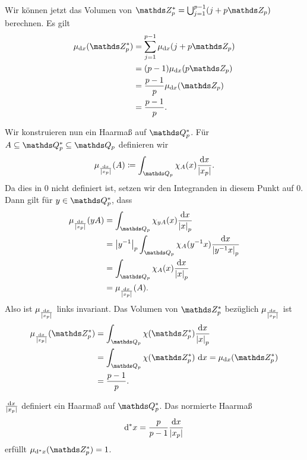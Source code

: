 \begin{bsp}
Wir können jetzt das Volumen von $\Z_p^\ast=\bigcup_{j=1}^{p-1}(j+p\Z_p)$ berechnen.
Es gilt
\begin{align*}
\mu_{\mathrm{d}x}(\Z_p^\ast)&=\sum_{j=1}^{p-1} \mu_{\mathrm{d}x}(j+p\Z_p)\\
&=(p-1)\mu_{\mathrm{d}x}(p \Z_p)\\
&=\frac{p-1}{p}\mu_{\mathrm{d}x}(\Z_p)\\
&=\frac{p-1}{p}.
\end{align*}
\end{bsp}

Wir konstruieren nun ein Haarmaß auf $\Q_p^\ast$.
Für $A \subseteq \Q_p^\ast\subseteq \Q_p$ definieren wir
\begin{align*}
\mu_{\frac{\mathrm{d}x}{\abs{x_p}}}(A)\coloneqq \int_{\Q_p} \chi_A(x)\frac{\mathrm{d}x}{\abs{x_p}}.
\end{align*}
Da dies in $0$ nicht definiert ist, setzen wir den Integranden in diesem Punkt auf $0$.
Dann gilt für $y\in \Q_p^\ast$, dass
\begin{align*}
\mu_{\frac{\mathrm{d}x}{\abs{x_p}}}(yA)&=\int_{\Q_p} \chi_{yA}(x)\frac{\mathrm{d}x}{\abs{x}_p}\\
&=\abs{y^{-1}}_p \int_{\Q_p}\chi_A(y^{-1}x)\frac{\mathrm{d}x}{\abs{y^{-1}x}_p}\\
&=\int_{\Q_p} \chi_A(x)\frac{\mathrm{d}x}{\abs{x}_p}\\
&=\mu_{\frac{\mathrm{d}x}{\abs{x_p}}}(A).
\end{align*}
Also ist $\mu_{\frac{\mathrm{d}x}{\left\vert x_p\right\vert}}$ links invariant.
Das Volumen von $\Z_p^\ast$ bezüglich $\mu_{\frac{\mathrm{d}x}{\left\vert x_p\right\vert}}$ ist
\begin{align*}
\mu_{\frac{\mathrm{d}x}{\abs{x_p}}}(\Z_p^\ast)&=\int_{\Q_p}\chi(\Z_p^\ast) \frac{\mathrm{d}x}{\abs{x}_p}\\
&=\int_{\Q_p}\chi(\Z_p^\ast)~\mathrm{d}x=\mu_{\mathrm{d}x}(\Z_p^\ast)\\
&=\frac{p-1}{p}.
\end{align*}

\begin{thm}
${\frac{\mathrm{d}x}{\left\vert x_p\right\vert}}$ definiert ein Haarmaß auf $\Q_p^\ast$.
Das normierte Haarmaß
\begin{align*}
\mathrm{d}^\ast x =\frac{p}{p-1}{\frac{\mathrm{d}x}{\left\vert x_p\right\vert}}
\end{align*}
erfüllt $\mu_{\mathrm{d}^\ast x}(\Z_p^\ast)=1$.
\end{thm}

